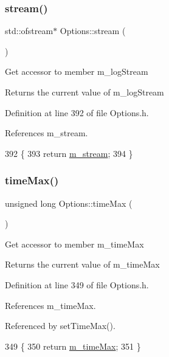 \subsubsection{\texorpdfstring{stream()}{stream()}}
{\footnotesize\ttfamily std\+::ofstream$\ast$ Options\+::stream (\begin{DoxyParamCaption}{ }\end{DoxyParamCaption})\hspace{0.3cm}{\ttfamily [inline]}}

Get accessor to member m\+\_\+log\+Stream \begin{DoxyReturn}{Returns}
the current value of m\+\_\+log\+Stream 
\end{DoxyReturn}


Definition at line 392 of file Options.\+h.



References m\+\_\+stream.


\begin{DoxyCode}
392                                \{
393                 \textcolor{keywordflow}{return} \hyperlink{classOptions_a8c5485cd614fa90de6b1aa85a7d2191b}{m\_stream};
394         \}
\end{DoxyCode}
\mbox{\label{classOptions_a4569b8790af48109c8639bec7b626fa6}} 
\subsubsection{\texorpdfstring{time\+Max()}{timeMax()}}
{\footnotesize\ttfamily unsigned long Options\+::time\+Max (\begin{DoxyParamCaption}{ }\end{DoxyParamCaption})\hspace{0.3cm}{\ttfamily [inline]}}

Get accessor to member m\+\_\+time\+Max \begin{DoxyReturn}{Returns}
the current value of m\+\_\+time\+Max 
\end{DoxyReturn}


Definition at line 349 of file Options.\+h.



References m\+\_\+time\+Max.



Referenced by set\+Time\+Max().


\begin{DoxyCode}
349                                  \{
350                 \textcolor{keywordflow}{return} \hyperlink{classOptions_a2584abb6745a082f73e2917732cd00e1}{m\_timeMax};
351         \}
\end{DoxyCode}


